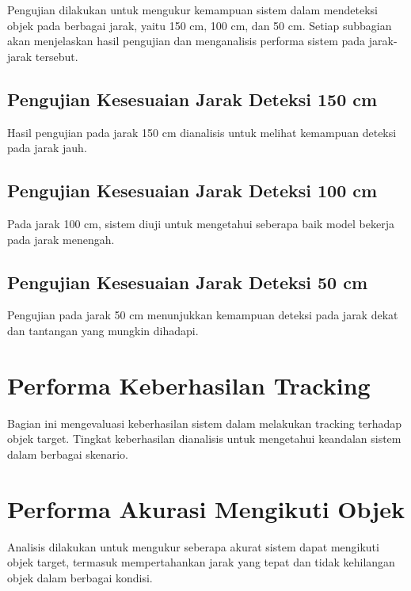 Pengujian dilakukan untuk mengukur kemampuan sistem dalam mendeteksi objek pada berbagai jarak, yaitu 150 cm, 100 cm, dan 50 cm. Setiap subbagian akan menjelaskan hasil pengujian dan menganalisis performa sistem pada jarak-jarak tersebut.

\subsection{Pengujian Kesesuaian Jarak Deteksi 150 cm}
\label{sec:pengujiankesesuaianjarakdeteksi150cm}

Hasil pengujian pada jarak 150 cm dianalisis untuk melihat kemampuan deteksi pada jarak jauh.

\subsection{Pengujian Kesesuaian Jarak Deteksi 100 cm}
\label{sec:pengujiankesesuaianjarakdeteksi100cm}

Pada jarak 100 cm, sistem diuji untuk mengetahui seberapa baik model bekerja pada jarak menengah.

\subsection{Pengujian Kesesuaian Jarak Deteksi 50 cm}
\label{sec:pengujiankesesuaianjarakdeteksi50cm}

Pengujian pada jarak 50 cm menunjukkan kemampuan deteksi pada jarak dekat dan tantangan yang mungkin dihadapi.

\section{Performa Keberhasilan Tracking}
\label{sec:performakeberhasiltracking}

Bagian ini mengevaluasi keberhasilan sistem dalam melakukan tracking terhadap objek target. Tingkat keberhasilan dianalisis untuk mengetahui keandalan sistem dalam berbagai skenario.

\section{Performa Akurasi Mengikuti Objek}
\label{sec:performaakurasiobjek}

Analisis dilakukan untuk mengukur seberapa akurat sistem dapat mengikuti objek target, termasuk mempertahankan jarak yang tepat dan tidak kehilangan objek dalam berbagai kondisi.

